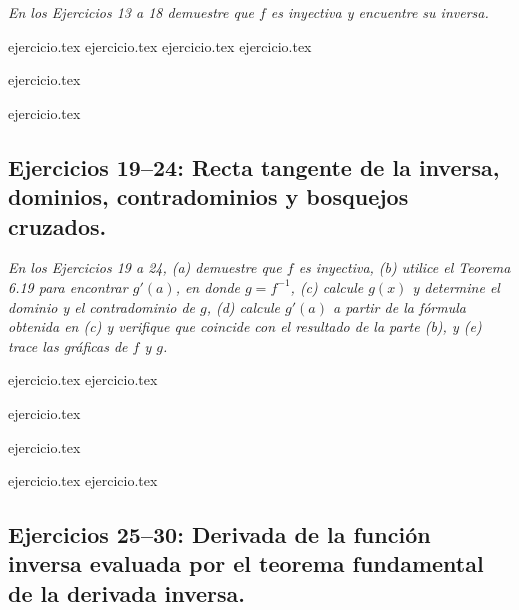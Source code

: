 \noindent \textit{En los Ejercicios 13 a 18 demuestre que $f$ es inyectiva y encuentre su inversa.}

\begin{enumerate}
    \setcounter{enumi}{12}
    \begin{minipage}{0.45\textwidth}
    {ejercicio.tex}
    {ejercicio.tex}
    {ejercicio.tex}
    {ejercicio.tex}
    \end{minipage}%
    \begin{minipage}{0.45\textwidth}
    {ejercicio.tex}
    \addtocounter{enumi}{1}
    {ejercicio.tex}
    \end{minipage}
\end{enumerate}

\subsection*{Ejercicios 19--24: Recta tangente de la inversa, dominios, contradominios y bosquejos cruzados.}

\noindent \textit{En los Ejercicios 19 a 24, (a) demuestre que $f$ es inyectiva, (b) utilice el Teorema 6.19 para encontrar $g'(a)$, en donde $g = f^{-1}$, (c) calcule $g(x)$ y determine el dominio y el contradominio de $g$, (d) calcule $g'(a)$ a partir de la fórmula obtenida en (c) y verifique que coincide con el resultado de la parte (b), y (e) trace las gráficas de $f$ y $g$.}

\begin{enumerate}
    \setcounter{enumi}{18}
    \begin{minipage}{0.45\textwidth}
    {ejercicio.tex}
    {ejercicio.tex}
    \end{minipage}%
    \begin{minipage}{0.45\textwidth}
    {ejercicio.tex}
    \addtocounter{enumi}{1}
    {ejercicio.tex}
    \end{minipage}
    
    \setcounter{enumi}{22}
    {ejercicio.tex}
    {ejercicio.tex}
\end{enumerate}

\subsection*{Ejercicios 25--30: Derivada de la función inversa evaluada por el teorema fundamental de la derivada inversa.}

